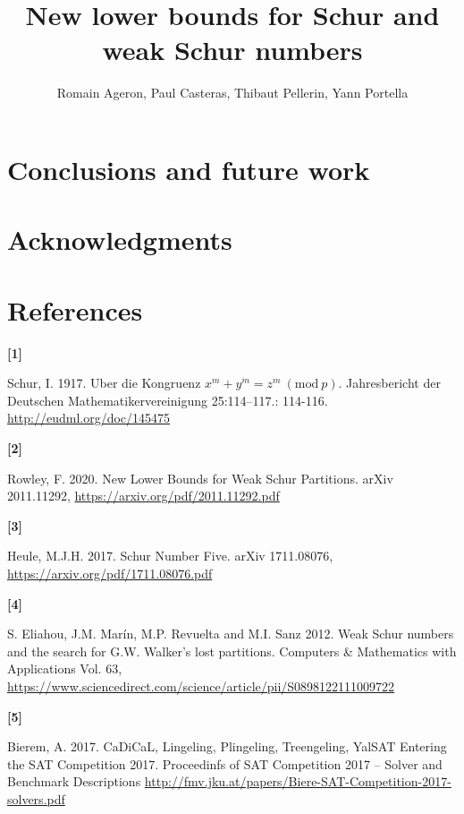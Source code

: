\documentclass{article}
\title{New lower bounds for Schur and weak Schur numbers}
\author{Romain Ageron, Paul Casteras, Thibaut Pellerin, Yann Portella}
\newtheorem{computational theorem}{Computational Theorem}[section]
\begin{document}
\maketitle










\section{Conclusions and future work}



\section{Acknowledgments}



\section{References}

\hypertarget{label1}{\textbf{[1]}} Schur, I. 1917. Uber die Kongruenz \(x^m + y^m = z^m~(\text{mod}~p)\). Jahresbericht der
Deutschen Mathematikervereinigung 25:114–117.: 114-116. \url{http://eudml.org/doc/145475}

\hypertarget{label2}{\textbf{[2]}} Rowley, F. 2020. New Lower Bounds for Weak Schur Partitions. arXiv 2011.11292,
\url{https://arxiv.org/pdf/2011.11292.pdf}

\hypertarget{label3}{\textbf{[3]}} Heule, M.J.H. 2017. Schur Number Five. arXiv 1711.08076, \url{https://arxiv.org/pdf/1711.08076.pdf}

\hypertarget{label4}{\textbf{[4]}} S. Eliahou, J.M. Marín, M.P. Revuelta and M.I. Sanz 2012. Weak Schur numbers and the search for G.W.
Walker’s lost partitions. Computers \& Mathematics with Applications Vol. 63, \url{https://www.sciencedirect.com/science/article/pii/S0898122111009722}

\hypertarget{label5}{\textbf{[5]}} Bierem, A. 2017. CaDiCaL, Lingeling, Plingeling, Treengeling, YalSAT Entering the SAT Competition 2017.
Proceedinfs of SAT Competition 2017 -- Solver and Benchmark Descriptions \url{http://fmv.jku.at/papers/Biere-SAT-Competition-2017-solvers.pdf}
\end{document}
